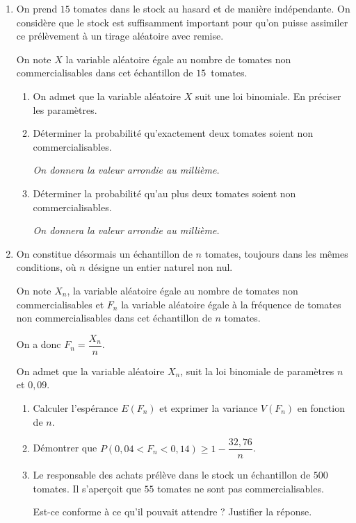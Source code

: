 \medskip

\begin{enumerate}
\item On prend $15$ tomates dans le stock au hasard et de manière indépendante. On considère que le stock est suffisamment important pour qu'on puisse assimiler ce prélèvement à un tirage aléatoire avec remise.

On note $X$ la variable aléatoire égale au nombre de tomates non commercialisables dans cet échantillon de $15$~tomates.
	\begin{enumerate}
		\item On admet que la variable aléatoire $X$ suit une loi binomiale. En préciser les paramètres.
		\item Déterminer la probabilité qu'exactement deux tomates soient non commercialisables.

\emph{On donnera la valeur arrondie au millième.}
		\item Déterminer la probabilité qu'au plus deux tomates soient non commercialisables.

\emph{On donnera la valeur arrondie au millième.}
	\end{enumerate}
\item On constitue désormais un échantillon de $n$ tomates, toujours dans les mêmes conditions, où $n$ désigne un entier naturel non nul.

On note $X_n$, la variable aléatoire égale au nombre de tomates non commercialisables et $F_n$ la variable aléatoire égale à la fréquence de tomates non commercialisables dans cet échantillon de $n$ tomates.

On a donc $F_n = \dfrac{X_n}{n}$.

On admet que la variable aléatoire $X_n$, suit la loi binomiale de paramètres $n$ et $0,09$.
	\begin{enumerate}
		\item Calculer l'espérance $E(F_n)$ et exprimer la variance $V(F_n)$ en fonction de $n$.
		\item Démontrer que $P(0,04 < F_n < 0,14) \geqslant 1 - \dfrac{32,76}{n}$.
		\item Le responsable des achats prélève dans le stock un échantillon de $500$ tomates. Il s'aperçoit que $55$ tomates ne sont pas commercialisables. 

Est-ce conforme à ce qu'il pouvait attendre ? Justifier la réponse.
	\end{enumerate}
\end{enumerate}

\medskip


